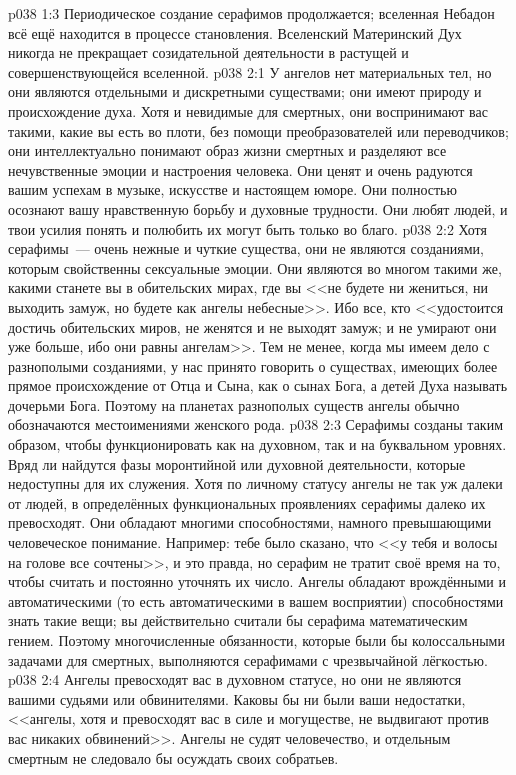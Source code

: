 \vs p038 1:3 Периодическое создание серафимов продолжается; вселенная Небадон всё ещё находится в процессе становления. Вселенский Материнский Дух никогда не прекращает созидательной деятельности в растущей и совершенствующейся вселенной.
\vs p038 2:1 У ангелов нет материальных тел, но они являются отдельными и дискретными существами; они имеют природу и происхождение духа. Хотя и невидимые для смертных, они воспринимают вас такими, какие вы есть во плоти, без помощи преобразователей или переводчиков; они интеллектуально понимают образ жизни смертных и разделяют все нечувственные эмоции и настроения человека. Они ценят и очень радуются вашим успехам в музыке, искусстве и настоящем юморе. Они полностью осознают вашу нравственную борьбу и духовные трудности. Они любят людей, и твои усилия понять и полюбить их могут быть только во благо.
\vs p038 2:2 \pc Хотя серафимы~--- очень нежные и чуткие существа, они не являются созданиями, которым свойственны сексуальные эмоции. Они являются во многом такими же, какими станете вы в обительских мирах, где вы <<не будете ни жениться, ни выходить замуж, но будете как ангелы небесные>>. Ибо все, кто <<удостоится достичь обительских миров, не женятся и не выходят замуж; и не умирают они уже больше, ибо они равны ангелам>>. Тем не менее, когда мы имеем дело с разнополыми созданиями, у нас принято говорить о существах, имеющих более прямое происхождение от Отца и Сына, как о сынах Бога, а детей Духа называть дочерьми Бога. Поэтому на планетах разнополых существ ангелы обычно обозначаются местоимениями женского рода.
\vs p038 2:3 Серафимы созданы таким образом, чтобы функционировать как на духовном, так и на буквальном уровнях. Вряд ли найдутся фазы моронтийной или духовной деятельности, которые недоступны для их служения. Хотя по личному статусу ангелы не так уж далеки от людей, в определённых функциональных проявлениях серафимы далеко их превосходят. Они обладают многими способностями, намного превышающими человеческое понимание. Например: тебе было сказано, что <<у тебя и волосы на голове все сочтены>>, и это правда, но серафим не тратит своё время на то, чтобы считать и постоянно уточнять их число. Ангелы обладают врождёнными и автоматическими (то есть автоматическими в вашем восприятии) способностями знать такие вещи; вы действительно считали бы серафима математическим гением. Поэтому многочисленные обязанности, которые были бы колоссальными задачами для смертных, выполняются серафимами с чрезвычайной лёгкостью.
\vs p038 2:4 \pc Ангелы превосходят вас в духовном статусе, но они не являются вашими судьями или обвинителями. Каковы бы ни были ваши недостатки, <<ангелы, хотя и превосходят вас в силе и могуществе, не выдвигают против вас никаких обвинений>>. Ангелы не судят человечество, и отдельным смертным не следовало бы осуждать своих собратьев.
